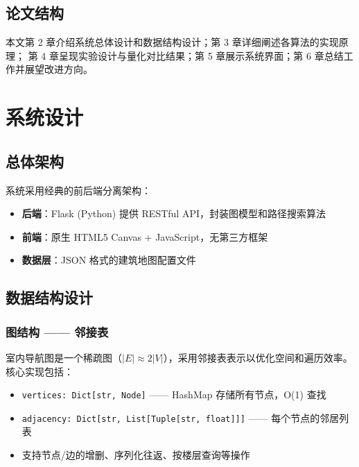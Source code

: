 \documentclass[11pt,a4paper]{ctexart}
\begin{document}
\subsection{论文结构}

本文第 2 章介绍系统总体设计和数据结构设计；第 3 章详细阐述各算法的实现原理；
第 4 章呈现实验设计与量化对比结果；第 5 章展示系统界面；第 6 章总结工作并展望改进方向。

\section{系统设计}

\subsection{总体架构}

系统采用经典的前后端分离架构：

\begin{itemize}
    \item \textbf{后端}：Flask (Python) 提供 RESTful API，封装图模型和路径搜索算法
    \item \textbf{前端}：原生 HTML5 Canvas + JavaScript，无第三方框架
    \item \textbf{数据层}：JSON 格式的建筑地图配置文件
\end{itemize}

\subsection{数据结构设计}

\subsubsection{图结构 —— 邻接表}

室内导航图是一个稀疏图（$|E| \approx 2|V|$），采用邻接表表示以优化空间和遍历效率。
核心实现包括：

\begin{itemize}
    \item \texttt{vertices: Dict[str, Node]} —— HashMap 存储所有节点，O(1) 查找
    \item \texttt{adjacency: Dict[str, List[Tuple[str, float]]]} —— 每个节点的邻居列表
    \item 支持节点/边的增删、序列化往返、按楼层查询等操作
\end{itemize}
\end{document}
